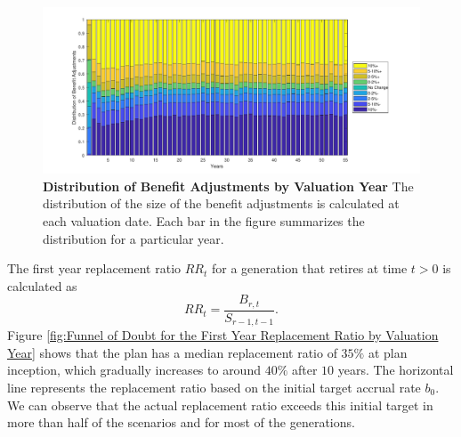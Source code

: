 \documentclass{sfuthesis}
\numberwithin{equation}{chapter}
\begin{document}
		\begin{figure}[h]
			\includegraphics[width=1\linewidth]{ResultPlot/ProbIncDc.pdf} 
			\caption[Distribution of Benefit Adjustments by Valuation Year]{\textbf{Distribution of Benefit Adjustments by Valuation Year}
				\vspace{-0.4cm}
				\newline\footnotesize \justify The distribution of the size of the benefit adjustments is calculated at each valuation date. Each bar in the figure summarizes the distribution for a particular year.}
			\label{fig:Distribution of Benefit Adjustments by Valuation Year}	
		\end{figure}
		\vspace{-0.4cm}
		\justify
		The first year replacement ratio $RR_{t}$ for a generation that retires at time $t>0$ is calculated as
		\begin{equation}
		\label{eq:VB_6}
		RR_{t} = \frac{B_{r,t}}{S_{r-1,t-1}}.
		\end{equation}
		 Figure \ref{fig:Funnel of Doubt for the First Year Replacement Ratio by Valuation Year} shows that the plan has a median replacement ratio of $35\%$ at plan inception, which gradually increases to around $40\%$ after $10$ years. The horizontal line represents the replacement ratio based on the initial target accrual rate $b_{0}$. We can observe that the actual replacement ratio exceeds this initial target in more than half of the scenarios and for most of the generations.  
	
\end{document}
